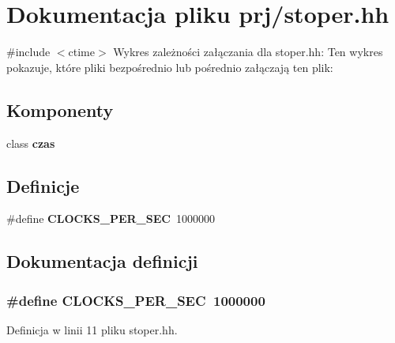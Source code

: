 \section{\-Dokumentacja pliku prj/stoper.hh}
\label{stoper_8hh}
{\ttfamily \#include $<$ctime$>$}\*
\-Wykres zależności załączania dla stoper.\-hh\-:
\-Ten wykres pokazuje, które pliki bezpośrednio lub pośrednio załączają ten plik\-:
\subsection*{\-Komponenty}
\begin{DoxyCompactItemize}
\item 
class {\bf czas}
\end{DoxyCompactItemize}
\subsection*{\-Definicje}
\begin{DoxyCompactItemize}
\item 
\#define {\bf \-C\-L\-O\-C\-K\-S\-\_\-\-P\-E\-R\-\_\-\-S\-E\-C}~1000000
\end{DoxyCompactItemize}


\subsection{\-Dokumentacja definicji}
\subsubsection[{\-C\-L\-O\-C\-K\-S\-\_\-\-P\-E\-R\-\_\-\-S\-E\-C}]{\setlength{\rightskip}{0pt plus 5cm}\#define {\bf \-C\-L\-O\-C\-K\-S\-\_\-\-P\-E\-R\-\_\-\-S\-E\-C}~1000000}\label{stoper_8hh_a3d9fc3c745d0880902fe3ea3d5d5f71e}


\-Definicja w linii 11 pliku stoper.\-hh.


